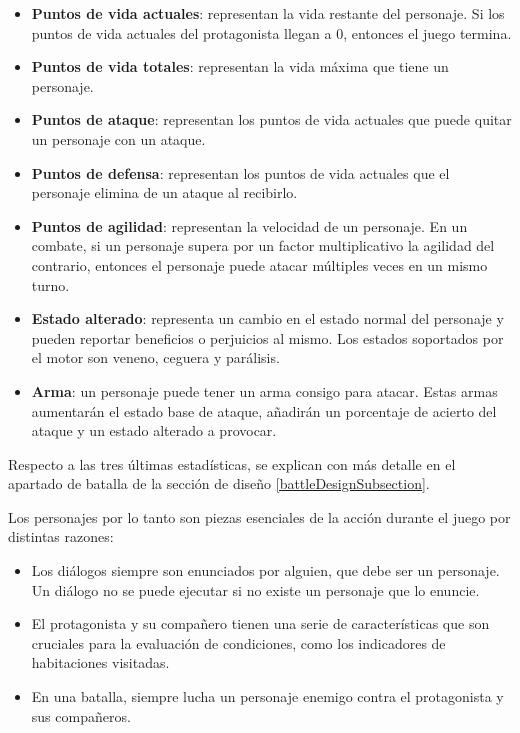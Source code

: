 \begin{itemize}
	\item \textbf{Puntos de vida actuales}: representan la vida restante del personaje. Si los puntos de vida actuales del protagonista llegan a 0, entonces el juego termina.
	\item \textbf{Puntos de vida totales}: representan la vida máxima que tiene un personaje.
	\item \textbf{Puntos de ataque}: representan los puntos de vida actuales que puede quitar un personaje con un ataque.
	\item \textbf{Puntos de defensa}: representan los puntos de vida actuales que el personaje elimina de un ataque al recibirlo.
	\item \textbf{Puntos de agilidad}: representan la velocidad de un personaje. En un combate, si un personaje supera por un factor multiplicativo la agilidad del contrario, entonces el personaje puede atacar múltiples veces en un mismo turno. 
	\item \textbf{Estado alterado}: representa un cambio en el estado normal del personaje y pueden reportar beneficios o perjuicios al mismo. Los estados soportados por el motor son veneno, ceguera y parálisis.
	\item \textbf{Arma}: un personaje puede tener un arma consigo para atacar. Estas armas aumentarán el estado base de ataque, añadirán un porcentaje de acierto del ataque y un estado alterado a provocar.
\end{itemize}

Respecto a las tres últimas estadísticas, se explican con más detalle en el apartado de batalla de la sección de diseño \ref{battleDesignSubsection}.

Los personajes por lo tanto son piezas esenciales de la acción durante el juego por distintas razones:

\begin{itemize}
	\item Los diálogos siempre son enunciados por alguien, que debe ser un personaje. Un diálogo no se puede ejecutar si no existe un personaje que lo enuncie.
	\item El protagonista y su compañero tienen una serie de características que son cruciales para la evaluación de condiciones, como los indicadores de habitaciones visitadas.
	\item En una batalla, siempre lucha un personaje enemigo contra el protagonista y sus compañeros.
\end{itemize}

